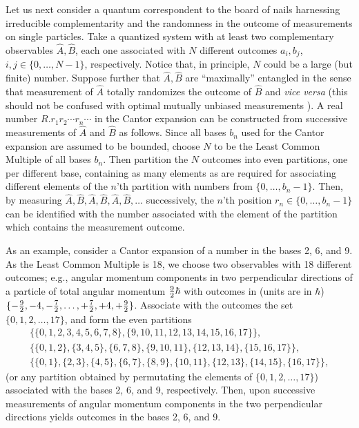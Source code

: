 Let us next consider a quantum correspondent to the  board of nails
harnessing irreducible complementarity and the randomness  in the outcome of measurements on single  particles.
Take a quantized system with at least two  complementary
observables
$\hat{A},\hat{B}$,
each one associated with $N$ different outcomes $a_i,b_j$, $i,j \in
\{0,\ldots ,N-1\}$, respectively.
Notice that, in principle, $N$ could be a large (but finite) number.
Suppose further that $\hat{A},\hat{B}$ are ``maximally'' entangled
in the sense that measurement of $\hat{A}$ totally randomizes the outcome
of $\hat{B}$ and {\it vice versa}
(this should not be confused with optimal mutually unbiased measurements \cite{WooFie}).
A real number $R.r_1r_2\cdots r_n \cdots $ in the Cantor expansion
can be constructed from successive  measurements of $\hat{A}$
and $\hat{B}$ as follows.
Since all bases $b_n$ used for the Cantor
expansion are assumed to be bounded, choose $N$ to be
the Least Common Multiple of all bases $b_n$.
Then partition the $N$ outcomes into even partitions,
one per different base,
containing as many elements as are required for
associating different elements of the $n$'th partition
with  numbers from $\{0,\ldots ,b_n-1\}$.
Then, by measuring $\hat{A},\hat{B},\hat{A},\hat{B},\hat{A},\hat{B},\ldots$
successively, the $n$'th position  $r_n \in \{0,\ldots ,b_n-1\}$
can be identified
with the number associated with the element of the partition which
contains the measurement outcome.

As an example, consider a Cantor expansion of a number in the bases
 2, 6, and 9. As the  Least Common Multiple is 18, we choose two
observables with 18 different outcomes; e.g., angular momentum
components in two perpendicular directions of a particle of total
angular
momentum  ${9\over 2} \hbar$ with outcomes in  (units are in $\hbar$)
$\{ -{9\over 2},-4,-{7\over 2},\ldots, +{7\over 2},+4,+{9\over 2}\}$.
Associate with the outcomes the set
$\{0,1,2,\ldots ,17\}$,
and form the even partitions
\begin{eqnarray}
&\{\{0,1,2,3,4,5,6,7,8\},\{9,10,11,12,13,14,15,16,17\}\},&\nonumber  \\
&\{\{0,1,2\},\{3,4,5\},\{6,7,8\},\{9,10,11\},\{12,13,14\},\{15,16,17\}\},&\nonumber  \\
&\{\{0,1\},\{2,3\},\{4,5\},\{6,7\},\{8,9\},\{10,11\},\{12,13\},\{14,15\},\{16,17\}\},&\nonumber
\end{eqnarray}
(or any partition obtained by permutating the elements of $\{0,1,2,\ldots ,17\}$)
associated with the bases  2, 6, and 9, respectively.
Then, upon successive measurements of angular momentum
components in the two perpendicular directions yields
outcomes  in the bases  2, 6, and 9.

